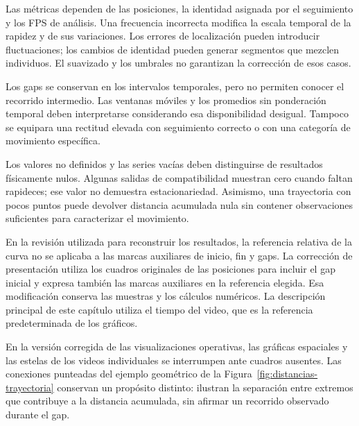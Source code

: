 Las métricas dependen de las posiciones, la identidad asignada por el seguimiento y los FPS de análisis. Una frecuencia incorrecta modifica la escala temporal de la rapidez y de sus variaciones. Los errores de localización pueden introducir fluctuaciones; los cambios de identidad pueden generar segmentos que mezclen individuos. El suavizado y los umbrales no garantizan la corrección de esos casos.

Los gaps se conservan en los intervalos temporales, pero no permiten conocer el recorrido intermedio. Las ventanas móviles y los promedios sin ponderación temporal deben interpretarse considerando esa disponibilidad desigual. Tampoco se equipara una rectitud elevada con seguimiento correcto o con una categoría de movimiento específica.

\begin{samepage}
Los valores no definidos y las series vacías deben distinguirse de resultados físicamente nulos. Algunas salidas de compatibilidad muestran cero cuando faltan rapideces; ese valor no demuestra estacionariedad. Asimismo, una trayectoria con pocos puntos puede devolver distancia acumulada nula sin contener observaciones suficientes para caracterizar el movimiento.
\par
\end{samepage}

En la revisión utilizada para reconstruir los resultados, la referencia relativa de la curva no se aplicaba a las marcas auxiliares de inicio, fin y gaps. La corrección de presentación utiliza los cuadros originales de las posiciones para incluir el gap inicial y expresa también las marcas auxiliares en la referencia elegida. Esa modificación conserva las muestras y los cálculos numéricos. La descripción principal de este capítulo utiliza el tiempo del video, que es la referencia predeterminada de los gráficos.

En la versión corregida de las visualizaciones operativas, las gráficas espaciales y las estelas de los videos individuales se interrumpen ante cuadros ausentes. Las conexiones punteadas del ejemplo geométrico de la Figura~\ref{fig:distancias-trayectoria} conservan un propósito distinto: ilustran la separación entre extremos que contribuye a la distancia acumulada, sin afirmar un recorrido observado durante el gap.
